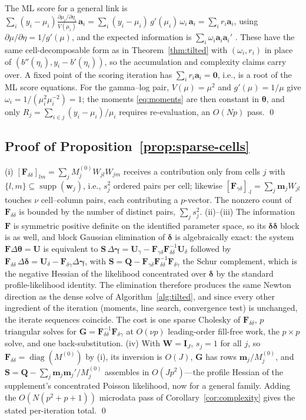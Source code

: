 \documentclass[11pt]{article}
\newcommand{\diag}{\operatorname{diag}}
\newcommand{\bgamma}{\bm{\gamma}}
\newcommand{\bdelta}{\bm{\delta}}
\newcommand{\btheta}{\bm{\theta}}
\newcommand{\bw}{\mathbf{w}}
\newcommand{\ba}{\mathbf{a}}
\newcommand{\bQ}{\mathbf{Q}}
\newcommand{\bF}{\mathbf{F}}
\newcommand{\bU}{\mathbf{U}}
\newcommand{\bW}{\mathbf{W}}
\newcommand{\bI}{\mathbf{I}}
\newcommand{\bS}{\mathbf{S}}
\newcommand{\bG}{\mathbf{G}}
\newcommand{\bzero}{\mathbf{0}}
\begin{document}
The ML score for a general link is $\sum_i (y_i - \mu_i)
\frac{\partial \mu_i / \partial \eta_i}{V(\mu_i)}\, \ba_i
= \sum_i (y_i - \mu_i)\, g'(\mu_i)\, \omega_i\, \ba_i = \sum_i r_i
\ba_i$, using $\partial\mu/\partial\eta = 1/g'(\mu)$, and the expected
information is $\sum_i \omega_i \ba_i \ba_i'$
\citep[Sec.~2.5]{mccullagh1989}.  These have the same
cell-decomposable form as in Theorem~\ref{thm:tilted} with
$(\omega_i, r_i)$ in place of $(b''(\eta_i), y_i - b'(\eta_i))$, so the
accumulation and complexity claims carry over.  A fixed point of the
scoring iteration has $\sum_i r_i \ba_i = \bzero$, i.e., is a root of
the ML score equations.  For the gamma--log pair, $V(\mu) = \mu^2$ and
$g'(\mu) = 1/\mu$ give $\omega_i = 1/(\mu_i^2 \mu_i^{-2}) = 1$; the
moments \eqref{eq:moments} are then constant in $\btheta$, and only
$R_j = \sum_{i\in j}(y_i - \mu_i)/\mu_i$ requires re-evaluation, an
$O(Np)$ pass. \qed

\subsection{Proof of Proposition~\ref{prop:sparse-cells}}

(i) $[\bF_{\delta\delta}]_{lm} = \sum_j M^{(0)}_j W_{jl} W_{jm}$
receives a contribution only from cells $j$ with
$\{l, m\} \subseteq \operatorname{supp}(\bw_j)$, i.e., $s_j^2$ ordered
pairs per cell; likewise
$[\bF_{\gamma\delta}]_{\cdot l} = \sum_j \mathbf{m}_j W_{jl}$ touches
$\nu$ cell--column pairs, each contributing a $p$-vector.  The nonzero
count of $\bF_{\delta\delta}$ is bounded by the number of distinct
pairs, $\sum_j s_j^2$.
(ii)--(iii) The information $\bF$ is symmetric positive definite on the
identified parameter space, so its $\bdelta\bdelta$ block is as well,
and block Gaussian elimination of $\bdelta$ is algebraically exact: the
system $\bF \Delta\btheta = \bU$ is equivalent to
$\bS\, \Delta\bgamma = \bU_\gamma -
\bF_{\gamma\delta}\bF_{\delta\delta}^{-1}\bU_\delta$ followed by
$\bF_{\delta\delta}\, \Delta\bdelta = \bU_\delta -
\bF_{\delta\gamma}\Delta\bgamma$, with
$\bS = \bQ - \bF_{\gamma\delta}\bF_{\delta\delta}^{-1}
\bF_{\delta\gamma}$ the Schur complement, which is the negative Hessian
of the likelihood concentrated over $\bdelta$ by the standard
profile-likelihood identity.  The elimination therefore produces the
same Newton direction as the dense solve of
Algorithm~\ref{alg:tilted}, and since every other ingredient of the
iteration (moments, line search, convergence test) is unchanged, the
iterate sequences coincide.  The cost is one sparse Cholesky of
$\bF_{\delta\delta}$, $p$ triangular solves for
$\bG = \bF_{\delta\delta}^{-1}\bF_{\delta\gamma}$ at $O(\nu p)$
leading-order fill-free work, the $p \times p$ solve, and one
back-substitution.
(iv) With $\bW = \bI_J$, $s_j = 1$ for all $j$, so
$\bF_{\delta\delta} = \diag(M^{(0)})$ by (i), its inversion is $O(J)$,
$\bG$ has rows $\mathbf{m}_j / M^{(0)}_j$, and
$\bS = \bQ - \sum_j \mathbf{m}_j \mathbf{m}_j' / M^{(0)}_j$ assembles
in $O(Jp^2)$---the profile Hessian of the supplement's concentrated
Poisson likelihood, now for a general family.  Adding the $O(N(p^2+p+1))$
microdata pass of Corollary~\ref{cor:complexity} gives the stated
per-iteration total. \qed



\end{document}
